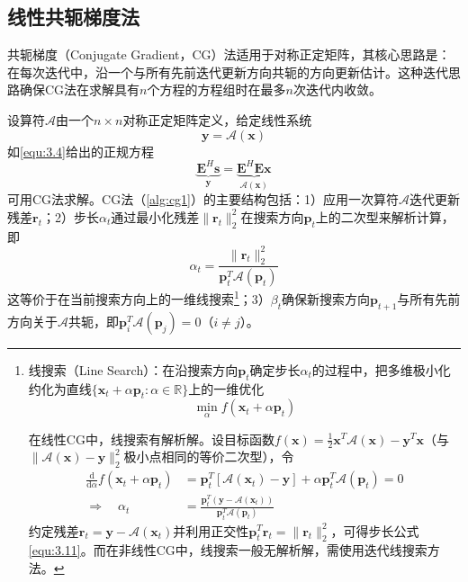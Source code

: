 \documentclass[12pt]{article}
\begin{document}
\subsection{线性共轭梯度法}
共轭梯度（Conjugate Gradient，CG）\label{term:CG}法适用于对称正定矩阵，其核心思路是：在每次迭代中，沿一个与所有先前迭代更新方向共轭的方向更新估计。这种迭代思路确保CG法在求解具有$n$个方程的方程组时在最多$n$次迭代内收敛。

设算符$\mathcal{A}$由一个$n\times n$对称正定矩阵定义，给定线性系统
\begin{equation}
    \bm{y}=\mathcal{A}(\bm{x})
    \label{equ:3.9}
\end{equation}
如\autoref{equ:3.4}给出的正规方程
\begin{equation}
    \underbrace{\mathbf{E}^H\bm{s}}_{\bm{y}}=\underbrace{\mathbf{E}^H\mathbf{E}\bm{x}}_{\mathcal{A}(\bm{x})}
    \label{equ:3.10}
\end{equation}
可用CG法求解。CG法（\autoref{alg:cg1}）的主要结构包括：1）应用一次算符$\mathcal{A}$迭代更新残差$\bm{r}_t$；2）步长$\alpha_t$通过最小化残差$\|\bm{r}_t\|_2^2$在搜索方向$\bm{p}_t$上的二次型来解析计算，即
\begin{equation}
    \alpha_t=\frac{\|\bm{r}_t\|_2^2}{\bm{p}_t^T\mathcal{A}(\bm{p}_t)}
    \label{equ:3.11}
\end{equation}
这等价于在当前搜索方向上的一维线搜索\footnote{线搜索（Line Search）：在沿搜索方向$\bm{p}_t$确定步长$\alpha_t$的过程中，把多维极小化约化为直线$\{\bm{x}_t+\alpha\bm{p}_t:\alpha\in\mathbb{R}\}$上的一维优化
\begin{equation}
    \min_\alpha f(\bm{x}_t+\alpha\bm{p}_t)
\end{equation}

在线性CG中，线搜索有解析解。设目标函数$f(\bm{x})=\frac{1}{2}\bm{x}^T\mathcal{A}(\bm{x})-\bm{y}^T\bm{x}$（与$\|\mathcal{A}(\bm{x})-\bm{y}\|_2^2$极小点相同的等价二次型），令
\begin{align}
    \frac{\mathrm{d}}{\mathrm{d}\alpha}f(\bm{x}_t+\alpha\bm{p}_t)&=\bm{p}_t^T\left[\mathcal{A}(\bm{x}_t)-\bm{y}\right]+\alpha\bm{p}_t^T\mathcal{A}(\bm{p}_t)=0 \\
    \Rightarrow\quad\alpha_t&=\frac{\bm{p}_t^T(\bm{y}-\mathcal{A}(\bm{x}_t))}{\bm{p}_t^T\mathcal{A}(\bm{p}_t)}
\end{align}
约定残差$\bm{r}_t=\bm{y}-\mathcal{A}(\bm{x}_t)$并利用正交性$\bm{p}_t^T\bm{r}_t=\|\bm{r}_t\|_2^2$，可得步长公式\autoref{equ:3.11}。而在非线性CG中，线搜索一般无解析解，需使用迭代线搜索方法。}；3）$\beta_t$确保新搜索方向$\bm{p}_{t+1}$与所有先前方向关于$\mathcal{A}$共轭，即$\bm{p}_i^T\mathcal{A}(\bm{p}_j)=0$（$i\neq j$）。
\end{document}
